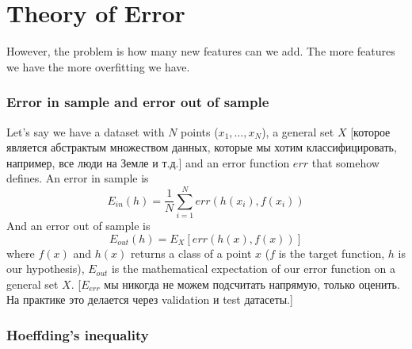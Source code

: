 \section{Theory of Error}

However, the problem is how many new features can we add. The more features we have the more overfitting we have.

\subsubsection*{Error in sample and error out of sample}

Let's say we have a dataset with $N$ points ($x_1,\ldots,x_N$), a general set $X$ [которое является абстрактым множеством данных, которые мы хотим классифицировать, например, все люди на Земле и т.д.] and an error function $err$ that somehow defines. An error in sample is
$$E_{in}(h)=\frac{1}{N}\sum\limits_{i=1}^N err(h(x_i),f(x_i))$$
And an error out of sample is
$$E_{out}(h)=E_X[err\left(h(x), f(x)\right)]$$
where $f(x)$ and $h(x)$ returns a class of a point $x$ ($f$ is the target function, $h$ is our hypothesis), $E_{out}$ is the mathematical expectation of our error function on a general set $X$. [$E_{err}$ мы никогда не можем подсчитать напрямую, только оценить. На практике это делается через validation и test датасеты.]\\

\subsubsection*{Hoeffding's inequality}

